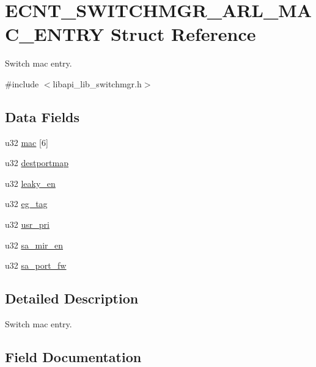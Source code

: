 \hypertarget{structECNT__SWITCHMGR__ARL__MAC__ENTRY}{}\section{E\+C\+N\+T\+\_\+\+S\+W\+I\+T\+C\+H\+M\+G\+R\+\_\+\+A\+R\+L\+\_\+\+M\+A\+C\+\_\+\+E\+N\+T\+RY Struct Reference}
\label{structECNT__SWITCHMGR__ARL__MAC__ENTRY}


Switch mac entry.  




{\ttfamily \#include $<$libapi\+\_\+lib\+\_\+switchmgr.\+h$>$}

\subsection*{Data Fields}
\begin{DoxyCompactItemize}
\item 
u32 \hyperlink{structECNT__SWITCHMGR__ARL__MAC__ENTRY_a43c4bb085574ce1d368ac14d4f711520}{mac} \mbox{[}6\mbox{]}
\item 
u32 \hyperlink{structECNT__SWITCHMGR__ARL__MAC__ENTRY_a93f82d22d7115f1ba7585dd51c9a51c3}{destportmap}
\item 
u32 \hyperlink{structECNT__SWITCHMGR__ARL__MAC__ENTRY_a572fad57e071a6cae6411be1ddfefe53}{leaky\+\_\+en}
\item 
u32 \hyperlink{structECNT__SWITCHMGR__ARL__MAC__ENTRY_a804951fc4596bb1de4cf9b15ba0092e6}{eg\+\_\+tag}
\item 
u32 \hyperlink{structECNT__SWITCHMGR__ARL__MAC__ENTRY_a31ad0c809314db96308915742c2224c4}{usr\+\_\+pri}
\item 
u32 \hyperlink{structECNT__SWITCHMGR__ARL__MAC__ENTRY_a11f515b0678da86f2dda0de730fc3f76}{sa\+\_\+mir\+\_\+en}
\item 
u32 \hyperlink{structECNT__SWITCHMGR__ARL__MAC__ENTRY_a32dfa2a0f7e5372c217bd900ed58c0c2}{sa\+\_\+port\+\_\+fw}
\end{DoxyCompactItemize}


\subsection{Detailed Description}
Switch mac entry. 

\subsection{Field Documentation}
\mbox{\label{structECNT__SWITCHMGR__ARL__MAC__ENTRY_a93f82d22d7115f1ba7585dd51c9a51c3}} 
